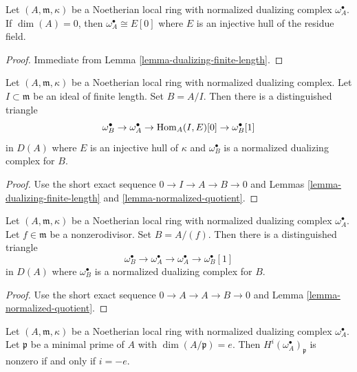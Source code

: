 \begin{lemma}
\label{lemma-dualizing-artinian}
Let $(A, \mathfrak m, \kappa)$ be a Noetherian local
ring with normalized dualizing complex $\omega_A^\bullet$.
If $\dim(A) = 0$, then $\omega_A^\bullet \cong E[0]$
where $E$ is an injective hull of the residue field.
\end{lemma}

\begin{proof}
Immediate from Lemma \ref{lemma-dualizing-finite-length}.
\end{proof}

\begin{lemma}
\label{lemma-divide-by-finite-length-ideal}
Let $(A, \mathfrak m, \kappa)$ be a Noetherian local
ring with normalized dualizing complex. Let $I \subset \mathfrak m$ be an
ideal of finite length. Set $B = A/I$. Then there is a distinguished
triangle
$$
\omega_B^\bullet \to \omega_A^\bullet \to \mathop{\mathrm{Hom}}\nolimits_A(I, E)[0] \to
\omega_B^\bullet[1]
$$
in $D(A)$ where $E$ is an injective hull of $\kappa$ and
$\omega_B^\bullet$ is a normalized dualizing complex for $B$.
\end{lemma}

\begin{proof}
Use the short exact sequence $0 \to I \to A \to B \to 0$
and Lemmas \ref{lemma-dualizing-finite-length} and
\ref{lemma-normalized-quotient}.
\end{proof}

\begin{lemma}
\label{lemma-divide-by-nonzerodivisor}
Let $(A, \mathfrak m, \kappa)$ be a Noetherian local
ring with normalized dualizing complex $\omega_A^\bullet$.
Let $f \in \mathfrak m$ be a
nonzerodivisor. Set $B = A/(f)$. Then there is a distinguished
triangle
$$
\omega_B^\bullet \to \omega_A^\bullet \to \omega_A^\bullet \to
\omega_B^\bullet[1]
$$
in $D(A)$ where $\omega_B^\bullet$ is a normalized dualizing complex
for $B$.
\end{lemma}

\begin{proof}
Use the short exact sequence $0 \to A \to A \to B \to 0$
and Lemma \ref{lemma-normalized-quotient}.
\end{proof}

\begin{lemma}
\label{lemma-nonvanishing-generically-local}
Let $(A, \mathfrak m, \kappa)$ be a Noetherian local ring with
normalized dualizing complex $\omega_A^\bullet$.
Let $\mathfrak p$ be a minimal prime of $A$ with
$\dim(A/\mathfrak p) = e$. Then
$H^i(\omega_A^\bullet)_\mathfrak p$ is nonzero
if and only if $i = -e$.
\end{lemma}

